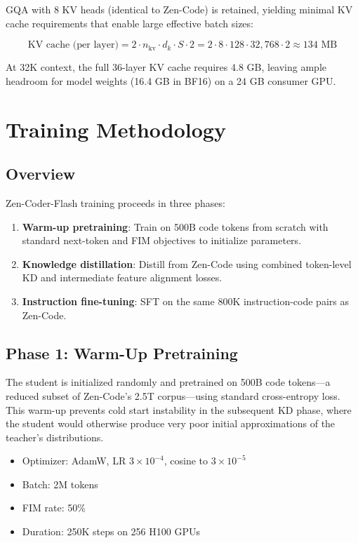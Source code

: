 \documentclass[11pt,a4paper]{article}
\begin{document}
GQA with 8 KV heads (identical to Zen-Code) is retained, yielding minimal KV cache
requirements that enable large effective batch sizes:

\begin{equation}
  \text{KV cache (per layer)} = 2 \cdot n_{\text{kv}} \cdot d_k \cdot S \cdot 2 = 2 \cdot 8 \cdot 128 \cdot 32{,}768 \cdot 2 \approx 134 \text{ MB}
\end{equation}

At 32K context, the full 36-layer KV cache requires 4.8 GB, leaving ample headroom for
model weights (16.4 GB in BF16) on a 24 GB consumer GPU.

\section{Training Methodology}

\subsection{Overview}

Zen-Coder-Flash training proceeds in three phases:

\begin{enumerate}
  \item \textbf{Warm-up pretraining}: Train on 500B code tokens from scratch with standard
        next-token and FIM objectives to initialize parameters.
  \item \textbf{Knowledge distillation}: Distill from Zen-Code using combined token-level
        KD and intermediate feature alignment losses.
  \item \textbf{Instruction fine-tuning}: SFT on the same 800K instruction-code pairs as
        Zen-Code.
\end{enumerate}

\subsection{Phase 1: Warm-Up Pretraining}

The student is initialized randomly and pretrained on 500B code tokens---a reduced subset
of Zen-Code's 2.5T corpus---using standard cross-entropy loss. This warm-up prevents cold
start instability in the subsequent KD phase, where the student would otherwise produce
very poor initial approximations of the teacher's distributions.

\begin{itemize}
  \item Optimizer: AdamW, LR $3 \times 10^{-4}$, cosine to $3 \times 10^{-5}$
  \item Batch: 2M tokens
  \item FIM rate: 50\%
  \item Duration: 250K steps on 256 H100 GPUs
\end{itemize}
\end{document}
